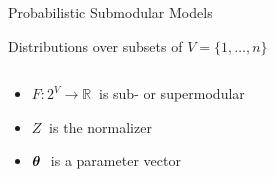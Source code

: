 \documentclass[mathserif]{beamer}
\begin{document}
\begin{frame}{Probabilistic Submodular Models}

\begin{center}
Distributions over subsets of $V = \{1,\ldots,n\}$

\vspace{0.8em}
\end{center}
\vspace{1.5em}

\begin{columns}
\begin{column}{0.54\textwidth}
\begin{itemize}
\item<2-> $F : 2^V \to \mathbb{R}\ $ is sub- or supermodular
\item<2-> $Z\ $ is the normalizer
\item<2-> $\bm{\theta}\ $ is a parameter vector
\end{itemize}
\vspace{0.6em}
\end{column}
\begin{column}{0.39\textwidth}
\end{column}
\end{columns}

\end{frame}
\end{document}
